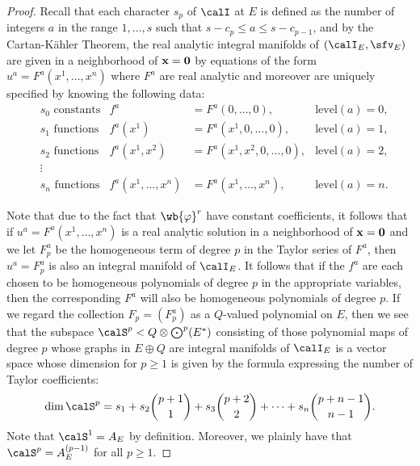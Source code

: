 \begin{proof}
    Recall that each character $s_p$ of $\calI$ at $E$ is defined as the number of integers $a$ in the range $1,\ldots,s$ such that $s-c_p\leq a\leq s-c_{p-1}$, and by the Cartan-K\"ahler Theorem, the real analytic integral manifolds of $(\calI_E,\sfv_E)$ are given in a neighborhood of $\bf{x}=0$ by equations of the form $u^a=F^a(x^1,\ldots,x^n)$ where $F^a$ are real analytic and moreover are uniquely specified by knowing the following data:
    \begin{align*}
        &s_0\text{ constants} & f^a&=F^a(0,\ldots,0), & \mathrm{level}(a)=0,\\
        &s_1\text{ functions} & f^a(x^1)&=F^a(x^1,0,\ldots,0), & \mathrm{level}(a)=1,\\
        &s_2\text{ functions} & f^a(x^1,x^2)&=F^a(x^1,x^2,0,\ldots,0), & \mathrm{level}(a)=2,\\
        &\vdots &&\\
        &s_n\text{ functions} & f^a(x^1,\ldots,x^n)&=F^a(x^1,\ldots,x^n), & \mathrm{level}(a)=n.
    \end{align*}

    Note that due to the fact that $\wb{\varphi}^r$ have constant coefficients, it follows that if $u^a=F^a(x^1,\ldots,x^n)$ is a real analytic solution in a  neighborhood of $\bf{x}=0$ and we let $F^a_p$ be the homogeneous term of degree $p$ in the Taylor series of $F^a$, then $u^a=F^a_p$ is also an integral manifold of $\calI_E$. It follows that if the $f^a$ are each chosen to be homogeneous polynomials of degree $p$ in the appropriate variables, then the corresponding $F^a$ will also be homogeneous polynomials of degree $p$. If we regard the collection $F_p=(F^a_p)$ as a $Q$-valued polynomial on $E$, then we see that the subspace $\calS^p<Q\otimes \bigodot^p(E^\ast)$ consisting of those polynomial maps of degree $p$ whose graphs in $E\oplus Q$ are integral manifolds of $\calI_E$ is a vector space whose dimension for $p\geq 1$ is given by the formula expressing the number of Taylor coefficients:
    \[\dim \calS^p=s_1+s_2\binom{p+1}{1}+s_3\binom{p+2}{2}+\cdots +s_n\binom{p+n-1}{n-1}.\]
    Note that $\calS^1=A_E$ by definition. Moreover, we plainly have that $\calS^p=A_E^{(p-1)}$ for all $p\geq 1$.


\end{proof}
